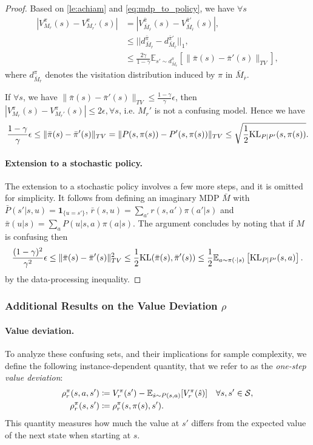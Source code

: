 \begin{proof}
    Based on \cref{le:achiam} and \cref{eq:mdp_to_policy}, we have $\forall s$ 
    \begin{align}
        |V^\pi_{M_r}(s)-V^\pi_{M_r'}(s)|&=|V_{\bar M_{\bar r}}^{\bar\pi}(s)-V_{\bar M_{\bar r}}^{\bar \pi'}(s)|, \\
        &\le ||d_{\bar M_{\bar r}}^{\bar \pi} - d_{\bar M_{\bar r}}^{\bar \pi'}||_1, \\
        &\le \frac{2\gamma}{1-\gamma}\mathbb{E}_{s'\sim d_{\bar M_{\bar r}}^\pi}[\|
        \bar \pi(s)-\bar\pi'(s)\|_{TV}],
    \end{align}
    where $d_{\bar M_{\bar r}}^{\pi}$ denotes the visitation distribution induced by $\pi$ in $\bar M_{\bar r}$.
    
    If $\forall s$, we have $\|\bar\pi(s)-\bar\pi'(s)\|_{TV}\le \frac{1-\gamma}{\gamma}\epsilon$, then $|V^\pi_{M_r}(s)-V^\pi_{M_r'}(s)|\le 2\epsilon,\forall s$, i.e. $M_r'$ is not a confusing model.  Hence we have
    \[
    \frac{1-\gamma}{\gamma}\epsilon \leq\|\bar\pi(s)-\bar\pi'(s)\|_{TV}=\|P(s,\pi(s))-P'(s,\pi(s))\|_{TV} \leq \sqrt{\frac{1}{2} {\rm KL}_{P|P'}(s,\pi(s))}. 
    \]

\paragraph{Extension to a stochastic policy.} The extension to a stochastic policy involves a few more steps, and it is omitted for simplicity. It follows from defining an imaginary MDP $\bar M$ with $\bar P(s'|s,u)=\mathbf{1}_{\{u=s'\}}$, $\bar r(s,u)=\sum_{a'}r(s,a')\pi(a'|s)$ and $\bar \pi(u|s)=\sum_a P(u|s,a)\pi(a|s)$. The argument concludes by noting that if $M$ is confusing then 
\[
 \frac{(1-\gamma)^2}{\gamma^2}\epsilon\leq \| \bar \pi(s)-\bar\pi'(s)\|_{TV}^2 \leq  \frac{1}{2}{\rm KL}(\bar \pi(s), \bar \pi'(s)) \leq \frac{1}{2}\mathbb{E}_{a\sim \pi(\cdot|s)}\left[{\rm KL}_{P|P'}(s,a)\right].
\]
by the data-processing inequality.
\end{proof}

\subsubsection{Additional Results on the Value Deviation $\rho$}
\label{app:value_deviation}

\paragraph{Value deviation.} To analyze these confusing sets, and their implications for sample complexity, we define the following instance-dependent quantity, that we refer to as the \emph{one-step value deviation}:
\begin{align*}\rho_r^\pi(s,a,s')&\coloneqq V_r^\pi(s') - \mathbb{E}_{\hat s \sim P(s,a)}[V_r^\pi(\hat s)] \quad\forall s,s'\in{\cal S},\\
\rho_r^\pi(s,s')&\coloneqq \rho_r^\pi(s,\pi(s),s').
\end{align*}
This quantity measures how much the value at $s'$ differs from the expected value of the next state when starting at $s$.  

